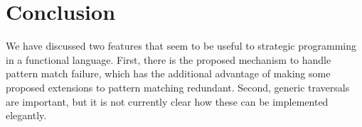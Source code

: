 \documentclass[fleqn]{article}
\begin{document}
\section{Conclusion}

We have discussed two features that seem to be useful to strategic
programming in a functional language.  First, there is the proposed
mechanism to handle pattern match failure, which has the additional
advantage of making some proposed extensions to pattern matching
redundant.  Second, generic traversals are important, but it is not
currently clear how these can be implemented elegantly.




\end{document}
